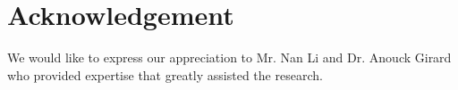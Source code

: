 \documentclass[10pt,journal]{IEEEtran}
\begin{document}

	\section*{Acknowledgement}

	We would like to express our appreciation to Mr. Nan Li and Dr. Anouck Girard who provided expertise that greatly assisted the research.




	
	
	
	
\end{document}
